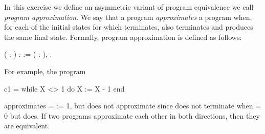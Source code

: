 \documentclass[12pt]{report}
\begin{document}
    In this exercise we define an asymmetric variant of program
    equivalence we call \textit{program approximation}. We say that a
    program  \textit{approximates} a program  when, for each of
    the initial states for which  terminates,  also terminates
    and produces the same final state. Formally, program approximation
    is defined as follows: 
\begin{coqdoccode}
\coqdocemptyline
\coqdocnoindent
{}  (  : ) :  := \coqdockw{\ensuremath{\forall}} (  : ),\coqdoceol
\coqdocindent{1.00em}
 \coqref{SECF.Imp.:::x '=[' x ']=>' x}{\coqdocnotation{=[}}  \coqref{SECF.Imp.:::x '=[' x ']=>' x}{\coqdocnotation{]=>}}    \coqref{SECF.Imp.:::x '=[' x ']=>' x}{\coqdocnotation{=[}}  \coqref{SECF.Imp.:::x '=[' x ']=>' x}{\coqdocnotation{]=>}} .\coqdoceol
\coqdocemptyline
\end{coqdoccode}
For example, the program


  c1 = while X <> 1 do
         X := X - 1
       end


    approximates  =  := 1, but  does not approximate 
    since  does not terminate when  = 0 but  does.  If two
    programs approximate each other in both directions, then they are
    equivalent. 
\end{document}
